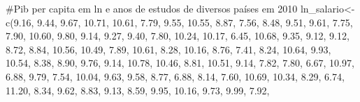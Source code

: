 \documentclass[
  letterpaper,
  DIV=11,
  numbers=noendperiod]{scrartcl}
\newenvironment{Shaded}{\begin{snugshade}}{\end{snugshade}}
\newcommand{\CommentTok}[1]{\textcolor[rgb]{0.37,0.37,0.37}{#1}}
\newcommand{\FloatTok}[1]{\textcolor[rgb]{0.68,0.00,0.00}{#1}}
\newcommand{\FunctionTok}[1]{\textcolor[rgb]{0.28,0.35,0.67}{#1}}
\newcommand{\NormalTok}[1]{\textcolor[rgb]{0.00,0.23,0.31}{#1}}
\newcommand{\OtherTok}[1]{\textcolor[rgb]{0.00,0.23,0.31}{#1}}
\begin{document}
\begin{Shaded}
\begin{Highlighting}[]
\CommentTok{\#Pib per capita em ln e anos de estudos de diversos países em 2010}
\NormalTok{ln\_salario}\OtherTok{\textless{}{-}} \FunctionTok{c}\NormalTok{(}\FloatTok{9.16}\NormalTok{, }\FloatTok{9.44}\NormalTok{, }\FloatTok{9.67}\NormalTok{, }\FloatTok{10.71}\NormalTok{, }\FloatTok{10.61}\NormalTok{, }\FloatTok{7.79}\NormalTok{, }\FloatTok{9.55}\NormalTok{, }\FloatTok{10.55}\NormalTok{, }\FloatTok{8.87}\NormalTok{, }\FloatTok{7.56}\NormalTok{,}
               \FloatTok{8.48}\NormalTok{, }\FloatTok{9.51}\NormalTok{, }\FloatTok{9.61}\NormalTok{, }\FloatTok{7.75}\NormalTok{, }\FloatTok{7.90}\NormalTok{, }\FloatTok{10.60}\NormalTok{, }\FloatTok{9.80}\NormalTok{, }\FloatTok{9.14}\NormalTok{, }\FloatTok{9.27}\NormalTok{, }\FloatTok{9.40}\NormalTok{, }
               \FloatTok{7.80}\NormalTok{, }\FloatTok{10.24}\NormalTok{, }\FloatTok{10.17}\NormalTok{, }\FloatTok{6.45}\NormalTok{, }\FloatTok{10.68}\NormalTok{, }\FloatTok{9.35}\NormalTok{, }\FloatTok{9.12}\NormalTok{, }\FloatTok{9.12}\NormalTok{, }\FloatTok{8.72}\NormalTok{, }\FloatTok{8.84}\NormalTok{,                   }\FloatTok{10.56}\NormalTok{, }\FloatTok{10.49}\NormalTok{, }\FloatTok{7.89}\NormalTok{, }\FloatTok{10.61}\NormalTok{, }\FloatTok{8.28}\NormalTok{, }\FloatTok{10.16}\NormalTok{, }\FloatTok{8.76}\NormalTok{, }\FloatTok{7.41}\NormalTok{, }\FloatTok{8.24}\NormalTok{, }\FloatTok{10.64}\NormalTok{, }
               \FloatTok{9.93}\NormalTok{, }\FloatTok{10.54}\NormalTok{, }\FloatTok{8.38}\NormalTok{, }\FloatTok{8.90}\NormalTok{, }\FloatTok{9.76}\NormalTok{, }\FloatTok{9.14}\NormalTok{, }\FloatTok{10.78}\NormalTok{, }\FloatTok{10.46}\NormalTok{, }\FloatTok{8.81}\NormalTok{, }\FloatTok{10.51}\NormalTok{,}
               \FloatTok{9.14}\NormalTok{, }\FloatTok{7.82}\NormalTok{,  }\FloatTok{7.80}\NormalTok{, }\FloatTok{6.67}\NormalTok{, }\FloatTok{10.97}\NormalTok{, }\FloatTok{6.88}\NormalTok{, }\FloatTok{9.79}\NormalTok{, }\FloatTok{7.54}\NormalTok{, }\FloatTok{10.04}\NormalTok{, }\FloatTok{9.63}\NormalTok{,}
               \FloatTok{9.58}\NormalTok{, }\FloatTok{8.77}\NormalTok{, }\FloatTok{6.88}\NormalTok{, }\FloatTok{8.14}\NormalTok{, }\FloatTok{7.60}\NormalTok{, }\FloatTok{10.69}\NormalTok{, }\FloatTok{10.34}\NormalTok{, }\FloatTok{8.29}\NormalTok{, }\FloatTok{6.74}\NormalTok{, }\FloatTok{11.20}\NormalTok{,}
               \FloatTok{8.34}\NormalTok{, }\FloatTok{9.62}\NormalTok{, }\FloatTok{8.83}\NormalTok{, }\FloatTok{9.13}\NormalTok{, }\FloatTok{8.59}\NormalTok{, }\FloatTok{9.95}\NormalTok{, }\FloatTok{10.16}\NormalTok{, }\FloatTok{9.73}\NormalTok{, }\FloatTok{9.99}\NormalTok{, }\FloatTok{7.92}\NormalTok{,}

\end{Highlighting}
\end{Shaded}
\end{document}
